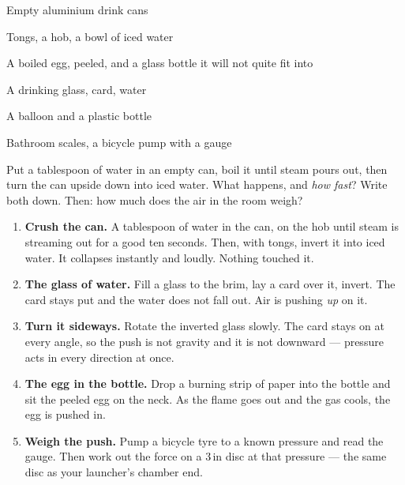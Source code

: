 



\begin{materials}
\item Empty aluminium drink cans
\item Tongs, a hob, a bowl of iced water
\item A boiled egg, peeled, and a glass bottle it will not quite fit into
\item A drinking glass, card, water
\item A balloon and a plastic bottle
\item Bathroom scales, a bicycle pump with a gauge
\end{materials}

\begin{predict}
Put a tablespoon of water in an empty can, boil it until steam pours out, then
turn the can upside down into iced water. What happens, and \emph{how fast}?
Write both down. Then: how much does the air in the room weigh?
\end{predict}

\begin{enumerate}
\item \textbf{Crush the can.} A tablespoon of water in the can, on the hob until steam is streaming out for a good ten seconds. Then, with tongs, invert it into iced water. It collapses instantly and loudly. Nothing touched it.
\item \textbf{The glass of water.} Fill a glass to the brim, lay a card over it, invert. The card stays put and the water does not fall out. Air is pushing \emph{up} on it.
\item \textbf{Turn it sideways.} Rotate the inverted glass slowly. The card stays on at every angle, so the push is not gravity and it is not downward --- pressure acts in every direction at once.
\item \textbf{The egg in the bottle.} Drop a burning strip of paper into the bottle and sit the peeled egg on the neck. As the flame goes out and the gas cools, the egg is pushed in.
\item \textbf{Weigh the push.} Pump a bicycle tyre to a known pressure and read the gauge. Then work out the force on a 3\,in disc at that pressure --- the same disc as your launcher's chamber end.
\end{enumerate}

